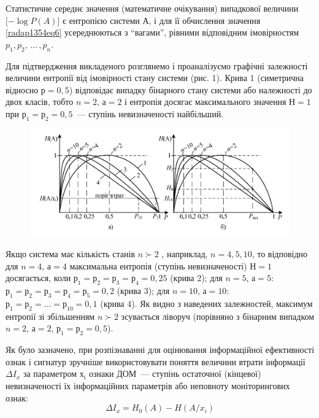 Статистичне середнє значення (математичне очікування) випадкової величини $[-\log P(A)$] є ентропією системи $А$, і для її обчислення значення \eqref{radap1354eq6} усереднюються з ``вагами'', рівними відповідним імовірностям $p_1, p_2,\,\ldots\,, p_n$.

Для підтвердження викладеного розглянемо і проаналізуємо графічні залежності величини ентропії від імовірності стану системи (рис. 1). Крива 1 (симетрична відносно $р = 0,5$) відповідає випадку бінарного стану системи або належності до двох класів, тобто $n= 2$, $а = 2$ і ентропія досягає максимального значення $Н = 1$ при $р_1= р_2= 0,5$~--- ступінь невизначеності найбільший.

\begin{figure}\centering%
	\includegraphics[width=0.75\linewidth]{fig1}
	
	\label{fig1}
\end{figure}

Якщо система має кількість станів $n \succ 2 $ , наприклад, $n = 4,5,10$, то відповідно для $n = 4$, $а = 4$ максимальна ентропія (ступінь невизначеності) $Н = 1$ досягається, коли $р_1 = р_2 = р_3 = р_4 = 0,25$ (крива 2); для $n = 5$, $а = 5$: $р_1 = р_2 = р_3 = р_4 = р_5 = 0,2$ (крива 3); для $n = 10$, $а = 10$: $р_1 = р_2 =\ldots= р_{10} = 0,1$ (крива 4). Як видно з наведених залежностей, максимум ентропії зі збільшенням $n \succ 2 $  зсувається ліворуч (порівняно з бінарним випадком 
$n= 2$, $а = 2$, $р_1= р_2= 0,5$).

Як було зазначено, при розпізнаванні для оцінювання інформаційної ефективності ознак і сигнатур зручніше використовувати поняття величини втрати інформації $\Delta I_x$ за параметром $х_і$ ознаки ДОМ~--- ступінь остаточної (кінцевої) невизначеності їх інформаційних параметрів або неповноту моніторингових ознак: 
\begin{equation}\label{radap1354eq7}
\Delta I_x = H_0(A)-H(A/x_i)
\end{equation}

